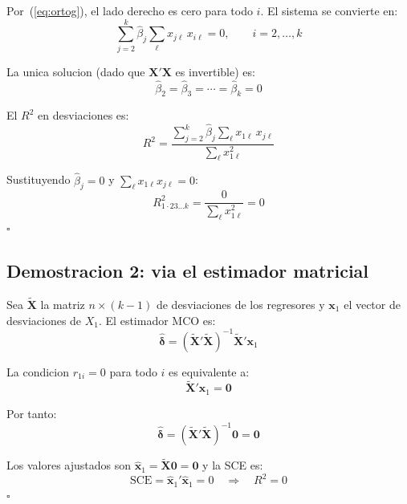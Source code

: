 \documentclass[12pt, letterpaper]{article}
\theoremstyle{remark}\newtheorem{obs}{Observacion}
\begin{document}
Por~(\ref{eq:ortog}), el lado derecho es cero para todo $i$. El sistema se convierte en:
\begin{equation}
  \sum_{j=2}^{k} \hat\beta_j \sum_\ell x_{j\ell}\, x_{i\ell} = 0, \qquad i = 2, \ldots, k
  \label{eq:normales_cero}
\end{equation}

La unica solucion (dado que $\mathbf{X'X}$ es invertible) es:
\begin{equation}
  \hat\beta_2 = \hat\beta_3 = \cdots = \hat\beta_k = 0
  \label{eq:betas_cero}
\end{equation}

El $R^2$ en desviaciones es:
\begin{equation}
  R^2 = \frac{\displaystyle\sum_{j=2}^{k} \hat\beta_j \sum_\ell x_{1\ell}\, x_{j\ell}}
             {\displaystyle\sum_\ell x_{1\ell}^2}
  \label{eq:R2_escalar}
\end{equation}

Sustituyendo $\hat\beta_j = 0$ y $\sum_\ell x_{1\ell} x_{j\ell} = 0$:
\begin{equation}
  \boxed{R^2_{1\cdot 23\ldots k} = \frac{0}{\sum_\ell x_{1\ell}^2} = 0}
  \label{eq:R2_cero}
\end{equation}
\hfill $\square$

\subsection{Demostracion 2: via el estimador matricial}

Sea $\tilde{\mathbf{X}}$ la matriz $n \times (k-1)$ de desviaciones de los regresores y $\mathbf{x}_1$ el vector de desviaciones de $X_1$. El estimador MCO es:
\begin{equation}
  \hat{\boldsymbol\delta} = (\tilde{\mathbf{X}}'\tilde{\mathbf{X}})^{-1}\tilde{\mathbf{X}}'\mathbf{x}_1
  \label{eq:MCO_mat}
\end{equation}

La condicion $r_{1i} = 0$ para todo $i$ es equivalente a:
\begin{equation}
  \tilde{\mathbf{X}}'\mathbf{x}_1 = \mathbf{0}
  \label{eq:ortog_mat}
\end{equation}

Por tanto:
\begin{equation}
  \hat{\boldsymbol\delta} = (\tilde{\mathbf{X}}'\tilde{\mathbf{X}})^{-1}\mathbf{0} = \mathbf{0}
\end{equation}

Los valores ajustados son $\hat{\mathbf{x}}_1 = \tilde{\mathbf{X}}\mathbf{0} = \mathbf{0}$ y la SCE es:
\begin{equation}
  \text{SCE} = \hat{\mathbf{x}}_1'\hat{\mathbf{x}}_1 = 0 \quad \Rightarrow \quad R^2 = 0
\end{equation}
\hfill $\square$
\end{document}
